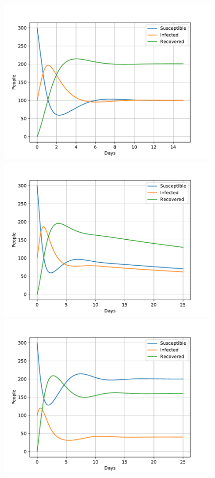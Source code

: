 \documentclass[a4paper]{article}
\begin{document}
\begin{figure}[!htb]
	\centering 
	\includegraphics[scale=0.56]{../plots/opp_c_A0.pdf}
	\includegraphics[scale=0.56]{../plots/opp_c_A1.pdf}
	\includegraphics[scale=0.56]{../plots/opp_c_B0.pdf}

\end{figure}
\end{document}
